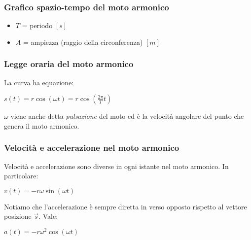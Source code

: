 \documentclass[]{beamer}
\theoremstyle{plain}
\begin{document}
\begin{frame}
\frametitle{Grafico spazio-tempo del moto armonico}
\begin{figure}
\end{figure}
\begin{itemize}
\item $ T $ = periodo $ [s] $ \item $ A $ = ampiezza (raggio della circonferenza) $ [m] $
\end{itemize}
\end{frame}

\begin{frame}
\frametitle{Legge oraria del moto armonico}
\begin{figure}
\end{figure}
La curva ha equazione:
\begin{center}
\colorbox{blue!30}{$ s(t) = r \cos (\omega t) = r \cos \left(\frac{2\pi}{T}t\right) $}
\end{center}
$ \omega $ viene anche detta \emph{pulsazione} del moto ed è la velocità angolare del punto che genera il moto armonico.
\end{frame}

\begin{frame}
  \frametitle{Velocità e accelerazione nel moto armonico}
  Velocità e accelerazione sono \alert<1>{diverse in ogni istante} nel moto armonico.{\pause} In particolare:
  \begin{center}
\colorbox{blue!30}{$ v(t) = - r\omega \sin (\omega t) $}
\end{center}\pause
Notiamo che l'accelerazione è sempre diretta in verso opposto rispetto al vettore posizione $ \vec{s} $. Vale:
\begin{center}
\colorbox{blue!30}{$ a(t) = - r\omega^2 \cos (\omega t) $}
\end{center}
\end{frame}
\end{document}
